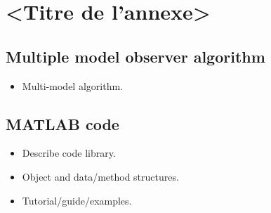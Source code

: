 \chapter{<Titre de l'annexe>}     %
\label{chap-}                   %

\section{Multiple model observer algorithm}

\begin{itemize}
	\item Multi-model algorithm.
\end{itemize}


\section{MATLAB code}

\begin{itemize}
	\item Describe code library.
	\item Object and data/method structures.
	\item Tutorial/guide/examples.
\end{itemize}